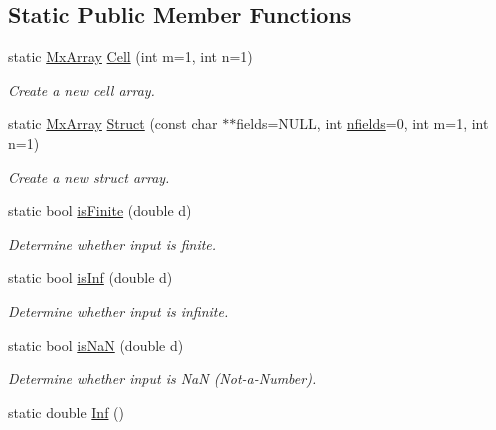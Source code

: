 \subsection*{\-Static \-Public \-Member \-Functions}
\begin{DoxyCompactItemize}
\item 
static \hyperlink{class_mx_array}{\-Mx\-Array} \hyperlink{class_mx_array_a293fb2fbf875cf62362df68e8e9cbbb0}{\-Cell} (int m=1, int n=1)
\begin{DoxyCompactList}\small\item\em \-Create a new cell array. \end{DoxyCompactList}\item 
static \hyperlink{class_mx_array}{\-Mx\-Array} \hyperlink{class_mx_array_af06a4fb3d50808a1fc2dee9772be4642}{\-Struct} (const char $\ast$$\ast$fields=\-N\-U\-L\-L, int \hyperlink{class_mx_array_aaafc4e535b9825a5690f056024cba34a}{nfields}=0, int m=1, int n=1)
\begin{DoxyCompactList}\small\item\em \-Create a new struct array. \end{DoxyCompactList}\item 
\hypertarget{class_mx_array_a229a284977cf6e7541dbc259aa480e00}{static bool \hyperlink{class_mx_array_a229a284977cf6e7541dbc259aa480e00}{is\-Finite} (double d)}\label{class_mx_array_a229a284977cf6e7541dbc259aa480e00}

\begin{DoxyCompactList}\small\item\em \-Determine whether input is finite. \end{DoxyCompactList}\item 
\hypertarget{class_mx_array_aea55ca36623b9c5d132cf734af4131a1}{static bool \hyperlink{class_mx_array_aea55ca36623b9c5d132cf734af4131a1}{is\-Inf} (double d)}\label{class_mx_array_aea55ca36623b9c5d132cf734af4131a1}

\begin{DoxyCompactList}\small\item\em \-Determine whether input is infinite. \end{DoxyCompactList}\item 
\hypertarget{class_mx_array_a4b52d1c8b45647c03187ea1c6cc7ace1}{static bool \hyperlink{class_mx_array_a4b52d1c8b45647c03187ea1c6cc7ace1}{is\-Na\-N} (double d)}\label{class_mx_array_a4b52d1c8b45647c03187ea1c6cc7ace1}

\begin{DoxyCompactList}\small\item\em \-Determine whether input is \-Na\-N (\-Not-\/a-\/\-Number). \end{DoxyCompactList}\item 
\hypertarget{class_mx_array_ac701c2d76f91958eb22b041f3be21d34}{static double \hyperlink{class_mx_array_ac701c2d76f91958eb22b041f3be21d34}{\-Inf} ()}\label{class_mx_array_ac701c2d76f91958eb22b041f3be21d34}


\end{DoxyCompactItemize}
